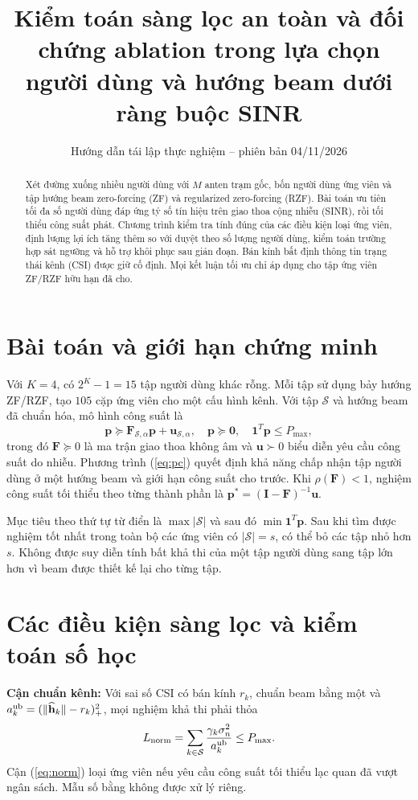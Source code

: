 \documentclass[onecolumn,11pt]{IEEEtran}
\title{Kiểm toán sàng lọc an toàn và đối chứng ablation trong lựa chọn người dùng và hướng beam dưới ràng buộc SINR}
\author{Hướng dẫn tái lập thực nghiệm -- phiên bản 04/11/2026}
\begin{document}
\maketitle
\begin{abstract}
Xét đường xuống nhiều người dùng với $M$ anten trạm gốc, bốn người dùng ứng viên và tập hướng beam zero-forcing (ZF) và regularized zero-forcing (RZF). Bài toán ưu tiên tối đa số người dùng đáp ứng tỷ số tín hiệu trên giao thoa cộng nhiễu (SINR), rồi tối thiểu công suất phát. Chương trình kiểm tra tính đúng của các điều kiện loại ứng viên, định lượng lợi ích tăng thêm so với duyệt theo số lượng người dùng, kiểm toán trường hợp sát ngưỡng và hỗ trợ khôi phục sau gián đoạn. Bán kính bất định thông tin trạng thái kênh (CSI) được giữ cố định. Mọi kết luận tối ưu chỉ áp dụng cho tập ứng viên ZF/RZF hữu hạn đã cho.
\end{abstract}
\section{Bài toán và giới hạn chứng minh}
Với $K=4$, có $2^K-1=15$ tập người dùng khác rỗng. Mỗi tập sử dụng bảy hướng ZF/RZF, tạo $105$ cặp ứng viên cho một cấu hình kênh. Với tập $\mathcal S$ và hướng beam đã chuẩn hóa, mô hình công suất là
\begin{equation}
\mathbf p\succeq\mathbf F_{\mathcal S,\alpha}\mathbf p+\mathbf u_{\mathcal S,\alpha},\quad \mathbf p\succeq\mathbf0,\quad \mathbf1^T\mathbf p\leq P_{\max},\label{eq:pc}
\end{equation}
trong đó $\mathbf F\succeq0$ là ma trận giao thoa không âm và $\mathbf u\succ0$ biểu diễn yêu cầu công suất do nhiễu. Phương trình (\ref{eq:pc}) quyết định khả năng chấp nhận tập người dùng ở một hướng beam và giới hạn công suất cho trước. Khi $\rho(\mathbf F)<1$, nghiệm công suất tối thiểu theo từng thành phần là $\mathbf p^*=(\mathbf I-\mathbf F)^{-1}\mathbf u$.

Mục tiêu theo thứ tự từ điển là $\max |\mathcal S|$ và sau đó $\min\mathbf1^T\mathbf p$. Sau khi tìm được nghiệm tốt nhất trong toàn bộ các ứng viên có $|\mathcal S|=s$, có thể bỏ các tập nhỏ hơn $s$. Không được suy diễn tính bất khả thi của một tập người dùng sang tập lớn hơn vì beam được thiết kế lại cho từng tập.
\section{Các điều kiện sàng lọc và kiểm toán số học}
\textbf{Cận chuẩn kênh:} Với sai số CSI có bán kính $r_k$, chuẩn beam bằng một và $a_k^{\rm ub}=(\|\widehat{\mathbf h}_k\|-r_k)_+^2$, mọi nghiệm khả thi phải thỏa
\begin{equation}
L_{\rm norm}=\sum_{k\in\mathcal S}\frac{\gamma_k\sigma_n^2}{a_k^{\rm ub}}\leq P_{\max}.\label{eq:norm}
\end{equation}
Cận (\ref{eq:norm}) loại ứng viên nếu yêu cầu công suất tối thiểu lạc quan đã vượt ngân sách. Mẫu số bằng không được xử lý riêng.
\end{document}
